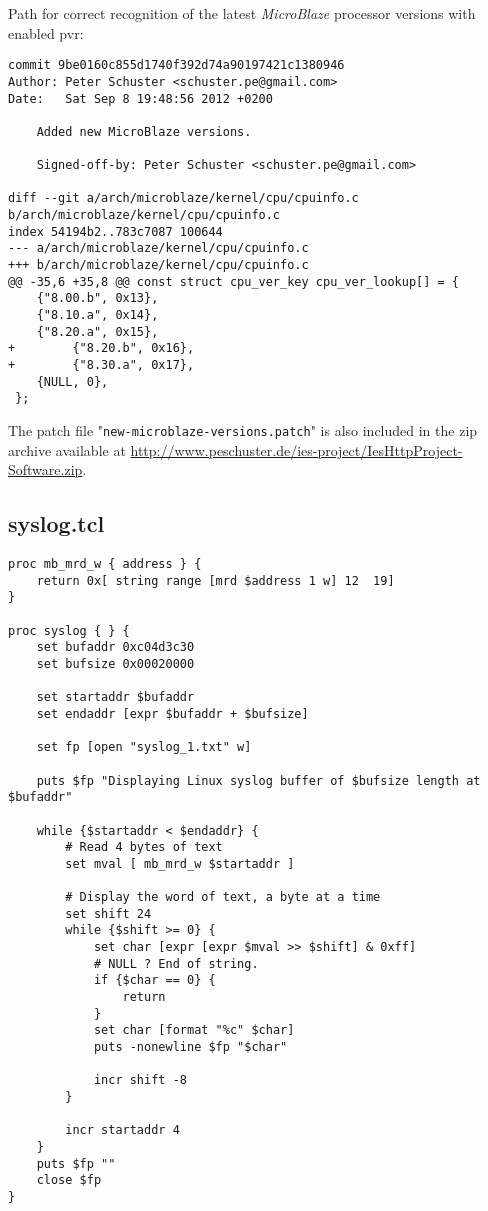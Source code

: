Path for correct recognition of the latest \textit{MicroBlaze} processor versions with enabled \gls{pvr}:

\begin{verbatim}
commit 9be0160c855d1740f392d74a90197421c1380946
Author: Peter Schuster <schuster.pe@gmail.com>
Date:   Sat Sep 8 19:48:56 2012 +0200

    Added new MicroBlaze versions.
    
    Signed-off-by: Peter Schuster <schuster.pe@gmail.com>

diff --git a/arch/microblaze/kernel/cpu/cpuinfo.c b/arch/microblaze/kernel/cpu/cpuinfo.c
index 54194b2..783c7087 100644
--- a/arch/microblaze/kernel/cpu/cpuinfo.c
+++ b/arch/microblaze/kernel/cpu/cpuinfo.c
@@ -35,6 +35,8 @@ const struct cpu_ver_key cpu_ver_lookup[] = {
 	{"8.00.b", 0x13},
 	{"8.10.a", 0x14},
 	{"8.20.a", 0x15},
+        {"8.20.b", 0x16},
+        {"8.30.a", 0x17},
 	{NULL, 0},
 };
\end{verbatim}

The patch file "\texttt{new-microblaze-versions.patch}" is also included in the zip archive available at \url{http://www.peschuster.de/ies-project/IesHttpProject-Software.zip}.

\subsection{syslog.tcl}
\label{subsec:syslog}

\begin{verbatim}
proc mb_mrd_w { address } {
    return 0x[ string range [mrd $address 1 w] 12  19]
}

proc syslog { } {
    set bufaddr 0xc04d3c30
    set bufsize 0x00020000

    set startaddr $bufaddr
    set endaddr [expr $bufaddr + $bufsize]
	
    set fp [open "syslog_1.txt" w]

    puts $fp "Displaying Linux syslog buffer of $bufsize length at $bufaddr"
	
    while {$startaddr < $endaddr} {
        # Read 4 bytes of text
        set mval [ mb_mrd_w $startaddr ]

        # Display the word of text, a byte at a time
        set shift 24
        while {$shift >= 0} {
            set char [expr [expr $mval >> $shift] & 0xff]
            # NULL ? End of string.
            if {$char == 0} {
                return
            }
            set char [format "%c" $char]
            puts -nonewline $fp "$char"

            incr shift -8
        }

        incr startaddr 4
    }
    puts $fp ""
    close $fp
}
\end{verbatim}

